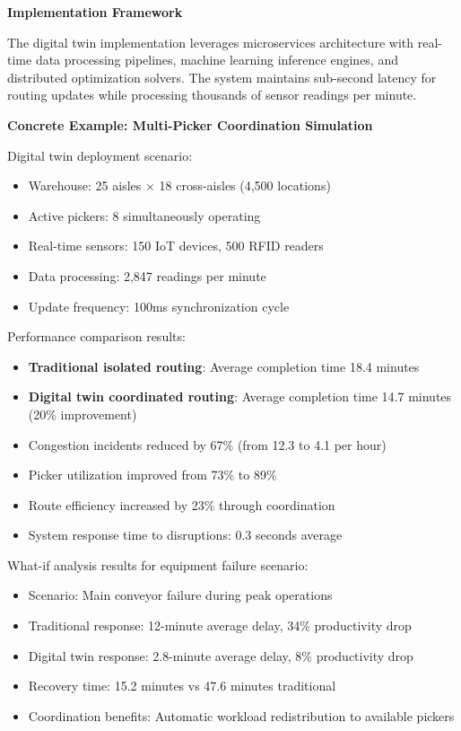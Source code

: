 \documentclass{article}
\begin{document}
\textbf{Implementation Framework}

The digital twin implementation leverages microservices architecture with real-time data processing pipelines, machine learning inference engines, and distributed optimization solvers. The system maintains sub-second latency for routing updates while processing thousands of sensor readings per minute.



\textbf{Concrete Example: Multi-Picker Coordination Simulation}

Digital twin deployment scenario:
\begin{itemize}
\item Warehouse: 25 aisles $\times$ 18 cross-aisles (4,500 locations)
\item Active pickers: 8 simultaneously operating 
\item Real-time sensors: 150 IoT devices, 500 RFID readers
\item Data processing: 2,847 readings per minute
\item Update frequency: 100ms synchronization cycle
\end{itemize}

Performance comparison results:
\begin{itemize}
\item \textbf{Traditional isolated routing}: Average completion time 18.4 minutes
\item \textbf{Digital twin coordinated routing}: Average completion time 14.7 minutes (20\% improvement)
\item Congestion incidents reduced by 67\% (from 12.3 to 4.1 per hour)
\item Picker utilization improved from 73\% to 89\%
\item Route efficiency increased by 23\% through coordination
\item System response time to disruptions: 0.3 seconds average
\end{itemize}

What-if analysis results for equipment failure scenario:
\begin{itemize}
\item Scenario: Main conveyor failure during peak operations
\item Traditional response: 12-minute average delay, 34\% productivity drop
\item Digital twin response: 2.8-minute average delay, 8\% productivity drop  
\item Recovery time: 15.2 minutes vs 47.6 minutes traditional
\item Coordination benefits: Automatic workload redistribution to available pickers
\end{itemize}
\end{document}
